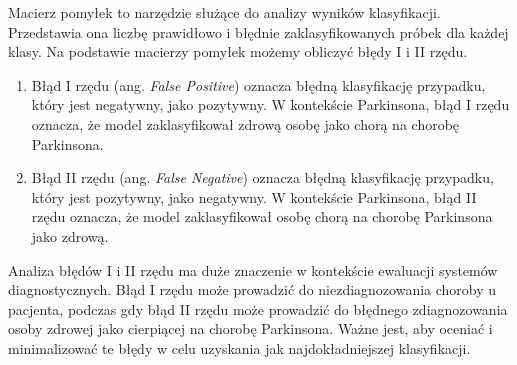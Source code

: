 Macierz pomyłek to narzędzie służące do analizy wyników klasyfikacji.
Przedstawia ona liczbę prawidłowo i błędnie zaklasyfikowanych próbek dla każdej klasy.
Na podstawie macierzy pomyłek możemy obliczyć błędy I i II rzędu.
\begin{enumerate}[label={\alph*)}]
	\item Błąd I rzędu (ang. \emph{False Positive}) oznacza błędną klasyfikację przypadku, który jest negatywny, jako pozytywny.
    W kontekście Parkinsona, błąd I rzędu oznacza, że model zaklasyfikował zdrową osobę jako chorą na chorobę Parkinsona.
\item Błąd II rzędu (ang. \emph{False Negative}) oznacza błędną klasyfikację przypadku, który jest pozytywny, jako negatywny.
    W kontekście Parkinsona, błąd II rzędu oznacza, że model zaklasyfikował osobę chorą na chorobę Parkinsona jako zdrową.
\end{enumerate}

Analiza błędów I i II rzędu ma duże znaczenie w kontekście ewaluacji systemów diagnostycznych.
Błąd I rzędu może prowadzić do niezdiagnozowania choroby u pacjenta, podczas gdy błąd II rzędu może prowadzić do błędnego zdiagnozowania osoby zdrowej jako cierpiącej na chorobę Parkinsona.
Ważne jest, aby oceniać i minimalizować te błędy w celu uzyskania jak najdokładniejszej klasyfikacji.
